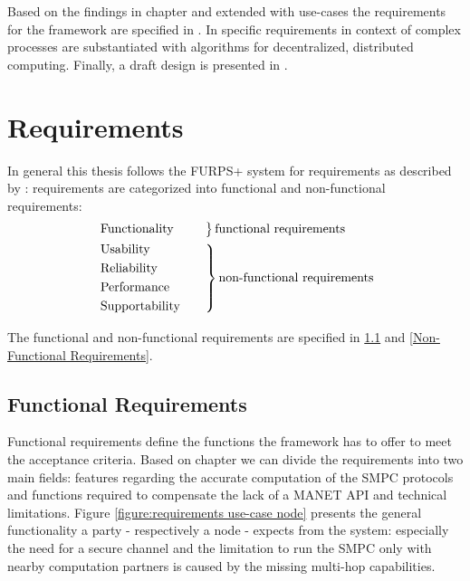 
Based on the findings in chapter  and extended with use-cases the requirements for the framework are specified in . In  specific requirements in context of complex processes are substantiated with algorithms for decentralized, distributed computing. Finally, a draft design is presented in .

\section{Requirements} \label{Requirements}

In general this thesis follows the FURPS+ system for requirements as described by \textcite{Online:FURPS}: 
requirements are categorized into functional and non-functional requirements:
\begin{alignat*}{1}
& \begin{rcases*}
\mathmakebox[\widthof{\text{Supportability}}][l]{\text{Functionality}} & \quad
\end{rcases*} \mathmakebox[\widthof{\text{non-functional requirements}}][l]{\text{functional requirements}} \\
& \begin{rcases*}
\text{Usability} & \quad \\
\text{Reliability} & \quad \\
\text{Performance} & \quad \\
\text{Supportability} & \quad
\end{rcases*} \text{non-functional requirements}
\end{alignat*}

The functional and non-functional requirements are specified in \ref{Functional Requirements} and \ref{Non-Functional Requirements}. 

\subsection{Functional Requirements} \label{Functional Requirements}

Functional requirements define the functions the framework has to offer to meet the acceptance criteria. Based on chapter  we can divide the requirements into two main fields: features regarding the accurate computation of the \gls{SMPC} protocols and functions required to compensate the lack of a \gls{MANET} \gls{API} and technical limitations.
Figure \ref{figure:requirements use-case node} presents the general functionality a party - respectively a node - expects from the system: especially the need for a secure channel and the limitation to run the \gls{SMPC} only with nearby computation partners is caused by the missing multi-hop capabilities.

